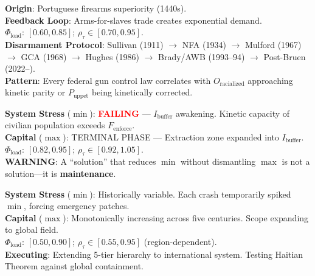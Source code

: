 \documentclass[12pt,openany]{book}
\begin{document}
\begin{tcolorbox}[colback=black!5, colframe=black!70, fonttitle=\bfseries\ttfamily, title=9. RUNTIME LOG: DISARMAMENT VARIABLE (FULL TIMELINE) \normalfont\small--- Chapter 8]
\ttfamily\small
\textbf{Origin}: Portuguese firearms superiority (1440s).\\
\textbf{Feedback Loop}: Arms-for-slaves trade creates exponential demand.\\
\textbf{$\Phi_{\text{load}}$}: $[0.60, 0.85]$; $\rho_{\tau} \in [0.70, 0.95]$.\\
\textbf{Disarmament Protocol}: Sullivan (1911) $\rightarrow$ NFA (1934) $\rightarrow$ Mulford (1967) $\rightarrow$ GCA (1968) $\rightarrow$ Hughes (1986) $\rightarrow$ Brady/AWB (1993--94) $\rightarrow$ Post-Bruen (2022--).\\
\textbf{Pattern}: Every federal gun control law correlates with $O_{\text{racialized}}$ approaching kinetic parity or $P_{\text{uppet}}$ being kinetically corrected.
\end{tcolorbox}

\begin{tcolorbox}[colback=black!5, colframe=black!70, fonttitle=\bfseries\ttfamily, title=10. RUNTIME LOG: PRESCRIPTIVE STRESS TEST \normalfont\small--- Chapter 9]
\ttfamily\small
\textbf{System Stress} ($\min$): \textcolor{red}{\textbf{FAILING}} --- $I_{\text{buffer}}$ awakening. Kinetic capacity of civilian population exceeds $F_{\text{enforce}}$.\\
\textbf{Capital} ($\max$): TERMINAL PHASE --- Extraction zone expanded into $I_{\text{buffer}}$.\\
\textbf{$\Phi_{\text{load}}$}: $[0.82, 0.95]$; $\rho_{\tau} \in [0.92, 1.05]$.\\
\textbf{WARNING}: A ``solution'' that reduces $\min$ without dismantling $\max$ is not a solution---it is \textbf{maintenance}.
\end{tcolorbox}

\begin{tcolorbox}[colback=black!5, colframe=black!70, fonttitle=\bfseries\ttfamily, title=11. RUNTIME LOG: SCALING TO IMPERIAL ARCHITECTURE \normalfont\small--- Chapter 10]
\ttfamily\small
\textbf{System Stress} ($\min$): Historically variable. Each crash temporarily spiked $\min$, forcing emergency patches.\\
\textbf{Capital} ($\max$): Monotonically increasing across five centuries. Scope expanding to global field.\\
\textbf{$\Phi_{\text{load}}$}: $[0.50, 0.90]$; $\rho_{\tau} \in [0.55, 0.95]$ (region-dependent).\\
\textbf{Executing}: Extending 5-tier hierarchy to international system. Testing Haitian Theorem against global containment.
\end{tcolorbox}
\end{document}
